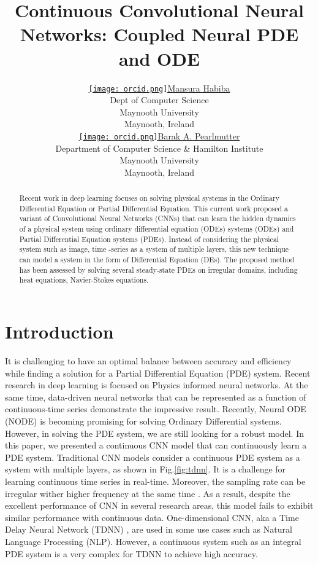\documentclass{article}
\title{Continuous Convolutional Neural Networks: Coupled Neural PDE and ODE}
\author{ 
	\href{https://orcid.org/0000-0001-9051-1370}{\texttt{[image: orcid.png]}\hspace{1mm}Mansura Habiba} \\
	Dept of Computer Science\\
	Maynooth University\\
	Maynooth, Ireland \\
	\And
	\href{https://orcid.org/0000-0003-0521-4553}{\texttt{[image: orcid.png]}\hspace{1mm}Barak A. Pearlmutter} \\
	Department of Computer Science \& Hamilton Institute\\
	Maynooth University\\
	Maynooth, Ireland \\
}
\begin{document}
\maketitle

\begin{abstract}
	Recent work in deep learning focuses on solving physical systems in the Ordinary Differential Equation or Partial Differential Equation. This current work proposed a variant of Convolutional Neural Networks (CNNs) that can learn the hidden dynamics of a physical system using ordinary differential equation (ODEs) systems (ODEs) and  Partial Differential Equation systems (PDEs). Instead of considering the physical system such as image, time -series as a system of multiple layers, this new technique can model a system in the form of Differential Equation (DEs). The proposed method has been assessed by solving several steady-state PDEs on irregular domains, including heat equations, Navier-Stokes equations. 
\end{abstract}




\section{Introduction}

It is challenging to have an optimal balance between accuracy and efficiency while finding a solution for a Partial Differential Equation (PDE) system. Recent research in deep learning is focused on Physics informed neural networks. At the same time, data-driven neural networks that can be represented as a function of continuous-time series demonstrate the impressive result. Recently, Neural ODE (NODE) \cite{chen2018neural} is becoming promising for solving Ordinary Differential systems. However, in solving the PDE system, we are still looking for a robust model. In this paper, we presented a continuous CNN model that can continuously learn a PDE system. Traditional CNN models consider a continuous PDE system as a system with multiple layers, as shown in Fig.\ref{fig:tdnn}. It is a challenge for learning continuous time series in real-time.
Moreover, the sampling rate can be irregular wither higher frequency at the same time \cite{neil2016phased}.  As a result, despite the excellent performance of CNN in several research areas, this model fails to exhibit similar performance with continuous data.  One-dimensional CNN, aka a Time Delay Neural Network (TDNN) \cite{Lang88}, are used in some use cases such as Natural Language Processing (NLP). However, a continuous system such as an integral PDE system is a very complex for TDNN to achieve high accuracy. 
\end{document}
